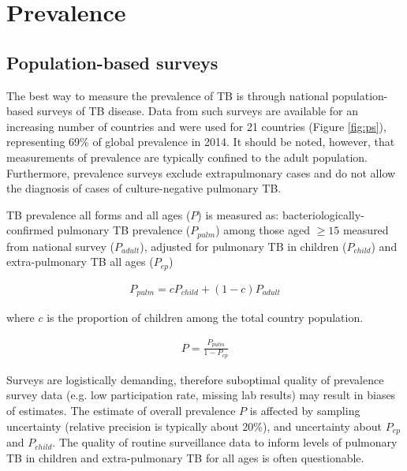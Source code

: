 \section{Prevalence}

\subsection{Population-based surveys}
The best way to measure the prevalence of TB is through national population-based surveys of TB disease\cite{18713496}\cite{WHO2011}. Data from such surveys are available for an increasing number of countries and were used for 21 countries (Figure \ref{fig:ps}), representing 69\% of global prevalence in 2014. It should be noted, however, that measurements of prevalence are typically confined to the adult population. Furthermore, prevalence surveys exclude extrapulmonary cases and do not allow the diagnosis of cases of culture-negative pulmonary TB. 

TB prevalence all forms and all ages ($P$) is measured as:  bacteriologically-confirmed pulmonary TB prevalence ($P_{pulm}$) among those aged $\geq 15$ measured from national survey ($P_{adult}$), adjusted for pulmonary TB in children ($P_{child}$) and extra-pulmonary TB all ages ($P_{ep}$)

\begin{align*}
P_{pulm} = c P_{child} + (1 − c) P_{adult}
\end{align*}

where $c$ is the proportion of children among the total country population.

\begin{align*}
P = \frac{P_{pulm}}{1 - P_{ep}}
\end{align*}

Surveys are logistically demanding, therefore suboptimal quality of prevalence survey data (e.g. low participation rate, missing lab results) may result in biases of estimates. The estimate of overall prevalence $P$ is affected by sampling uncertainty (relative precision is typically about 20\%), and uncertainty about $P_{ep}$ and $P_{child}$. The  quality of routine surveillance data to inform levels of pulmonary TB in children and extra-pulmonary TB for all ages is often questionable.



 
